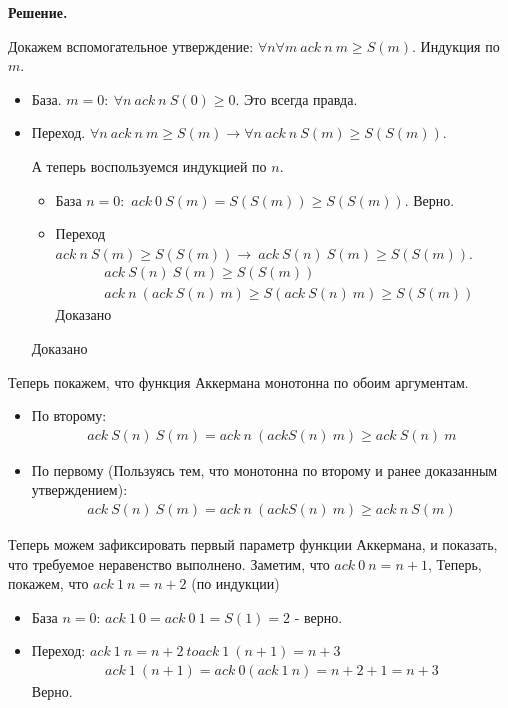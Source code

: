 \begin{enumerate}
\textbf{Решение.}

Докажем вспомогательное утверждение: $\forall n \forall m \ ack \ n \ m \geq S(m)$. Индукция по $m$.
\begin{itemize}
	\item База. $m = 0: \ \forall n \ ack \ n \ S(0) \geq 0$. Это всегда правда.
	\item Переход. $\forall n \ ack \ n \ m \geq S(m) \to \forall n \ ack \ n \ S(m) \geq S(S(m))$.
	
	А теперь воспользуемся индукцией по $n$. 
	\begin{itemize}
		\item База $n = 0:$ $ack \ 0 \ S(m) = S(S(m)) \geq S(S(m))$. Верно.
		\item Переход $ack \ n \ S(m) \geq S(S(m)) \to \ ack \ S(n) \ S(m) \geq S(S(m))$.
		\begin{align*}
		& ack \ S(n) \ S(m) \geq S(S(m)) \\
		& ack \ n \ (ack \ S(n) \ m) \geq S(ack \ S(n) \ m) \geq S(S(m)) 
		\end{align*}
		Доказано
	\end{itemize}
	Доказано
\end{itemize}

Теперь покажем, что функция Аккермана монотонна по обоим аргументам.
\begin{itemize}
	\item По второму:
	\begin{align*}
		ack \ S(n) \ S(m) = ack \ n \ (ack S(n) \ m) \geq ack \ S(n) \ m 
	\end{align*}
	\item По первому (Пользуясь тем, что монотонна по второму и ранее доказанным утверждением):
	\begin{align*}
		ack \ S(n) \ S(m) = ack \ n \ (ack S(n) \ m) \geq ack \ n \ S(m)
	\end{align*}
\end{itemize}

Теперь можем зафиксировать первый параметр функции Аккермана, и показать, что требуемое неравенство выполнено. 
Заметим, что $ack \ 0 \ n = n + 1$, Теперь, покажем, что $ack \ 1 \ n = n + 2$ (по индукции) 
\begin{itemize}
	\item База $n = 0$: $ack \ 1 \ 0 = ack \ 0 \ 1 = S(1) = 2$ - верно.
	\item Переход: $ack \ 1 \ n = n + 2 \ to ack \ 1 \ (n + 1) = n + 3$
	\begin{align*}
		ack \ 1 \ (n + 1) = ack \ 0 (ack \ 1 \ n) = n + 2 + 1 = n + 3
	\end{align*}
	Верно.
\end{itemize}


\end{enumerate}
